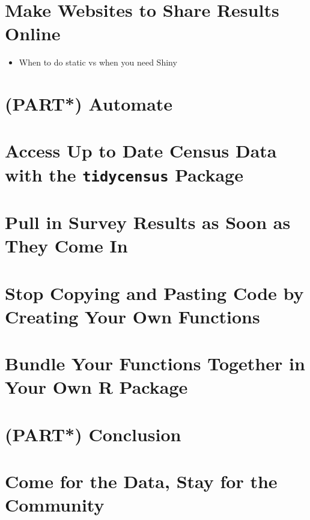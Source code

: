 \documentclass[
]{book}
\providecommand{\tightlist}{%
  \setlength{\itemsep}{0pt}\setlength{\parskip}{0pt}}
\begin{document}
\hypertarget{make-websites-to-share-results-online}{%
\chapter{Make Websites to Share Results Online}\label{make-websites-to-share-results-online}}

\begin{itemize}
\tightlist
\item
  When to do static vs when you need Shiny
\end{itemize}

\hypertarget{part-automate}{%
\chapter{(PART*) Automate}\label{part-automate}}

\hypertarget{access-up-to-date-census-data-with-the-tidycensus-package}{%
\chapter{\texorpdfstring{Access Up to Date Census Data with the \texttt{tidycensus} Package}{Access Up to Date Census Data with the tidycensus Package}}\label{access-up-to-date-census-data-with-the-tidycensus-package}}

\hypertarget{pull-in-survey-results-as-soon-as-they-come-in}{%
\chapter{Pull in Survey Results as Soon as They Come In}\label{pull-in-survey-results-as-soon-as-they-come-in}}

\hypertarget{stop-copying-and-pasting-code-by-creating-your-own-functions}{%
\chapter{Stop Copying and Pasting Code by Creating Your Own Functions}\label{stop-copying-and-pasting-code-by-creating-your-own-functions}}

\hypertarget{bundle-your-functions-together-in-your-own-r-package}{%
\chapter{Bundle Your Functions Together in Your Own R Package}\label{bundle-your-functions-together-in-your-own-r-package}}

\hypertarget{part-conclusion}{%
\chapter{(PART*) Conclusion}\label{part-conclusion}}

\hypertarget{come-for-the-data-stay-for-the-community}{%
\chapter{Come for the Data, Stay for the Community}\label{come-for-the-data-stay-for-the-community}}
\end{document}
